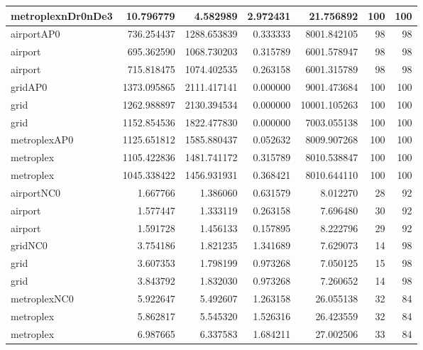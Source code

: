 \begin{longtable}{|l|r|r|r|r|r|r|}
metroplexnDr0nDe3 & 10.796779 & 4.582989 & 2.972431 & 21.756892 & 100 & 100 \\ \hline
airportAP0 & 736.254437 & 1288.653839 & 0.333333 & 8001.842105 & 98 & 98 \\ \hline
airport & 695.362590 & 1068.730203 & 0.315789 & 6001.578947 & 98 & 98 \\ \hline
airport & 715.818475 & 1074.402535 & 0.263158 & 6001.315789 & 98 & 98 \\ \hline
gridAP0 & 1373.095865 & 2111.417141 & 0.000000 & 9001.473684 & 100 & 100 \\ \hline
grid & 1262.988897 & 2130.394534 & 0.000000 & 10001.105263 & 100 & 100 \\ \hline
grid & 1152.854536 & 1822.477830 & 0.000000 & 7003.055138 & 100 & 100 \\ \hline
metroplexAP0 & 1125.651812 & 1585.880437 & 0.052632 & 8009.907268 & 100 & 100 \\ \hline
metroplex & 1105.422836 & 1481.741172 & 0.315789 & 8010.538847 & 100 & 100 \\ \hline
metroplex & 1045.338422 & 1456.931931 & 0.368421 & 8010.644110 & 100 & 100 \\ \hline
airportNC0 & 1.667766 & 1.386060 & 0.631579 & 8.012270 & 28 & 92 \\ \hline
airport & 1.577447 & 1.333119 & 0.263158 & 7.696480 & 30 & 92 \\ \hline
airport & 1.591728 & 1.456133 & 0.157895 & 8.222796 & 29 & 92 \\ \hline
gridNC0 & 3.754186 & 1.821235 & 1.341689 & 7.629073 & 14 & 98 \\ \hline
grid & 3.607353 & 1.798199 & 0.973268 & 7.050125 & 15 & 98 \\ \hline
grid & 3.843792 & 1.832030 & 0.973268 & 7.260652 & 14 & 98 \\ \hline
metroplexNC0 & 5.922647 & 5.492607 & 1.263158 & 26.055138 & 32 & 84 \\ \hline
metroplex & 5.862817 & 5.545320 & 1.526316 & 26.423559 & 32 & 84 \\ \hline
metroplex & 6.987665 & 6.337583 & 1.684211 & 27.002506 & 33 & 84 \\ \hline
\end{longtable}

